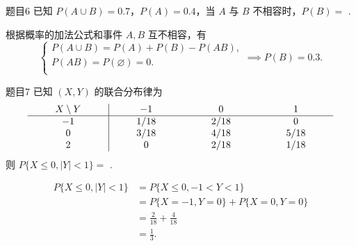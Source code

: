 \begin{question}{题目6}
    已知 $P(A \cup B) = 0.7$，$P(A) = 0.4$，当 $A$ 与 $B$ 不相容时，$P(B) = $ \underline{\hspace{2cm}}.
\end{question}
\begin{solution}
    根据概率的加法公式和事件 $A,B$ 互不相容，有
    $$
        \begin{cases}
            P(A \cup B)  = P(A) + P(B) - P(AB), \\
            P(AB) = P(\varnothing) = 0.         \\
        \end{cases}
        \implies
        P(B) = 0.3.
    $$
\end{solution}

\begin{question}{题目7}
    已知 $(X,Y)$ 的联合分布律为
    $$
        \setlength{\arraycolsep}{10mm}
        \begin{array}{c|ccccc}
            X \setminus Y & -1   & 0    & 1    \\
            \hline
            -1            & 1/18 & 2/18 & 0    \\
            0             & 3/18 & 4/18 & 5/18 \\
            2             & 0    & 2/18 & 1/18 \\
        \end{array}
    $$
    则 $P\{X \leqslant 0 , |Y|<1\} = $ \underline{\hspace{2cm}}.
\end{question}
\begin{solution}
    $$
        \begin{aligned}
            P\{X \leqslant 0 , |Y|<1\}
             & = P\{X \leqslant 0 , -1<Y<1\}    \\
             & = P\{X=-1, Y=0\} + P\{X=0, Y=0\} \\
             & = \frac{2}{18} + \frac{4}{18}    \\
             & = \frac{1}{3}.                   \\
        \end{aligned}
    $$
\end{solution}

